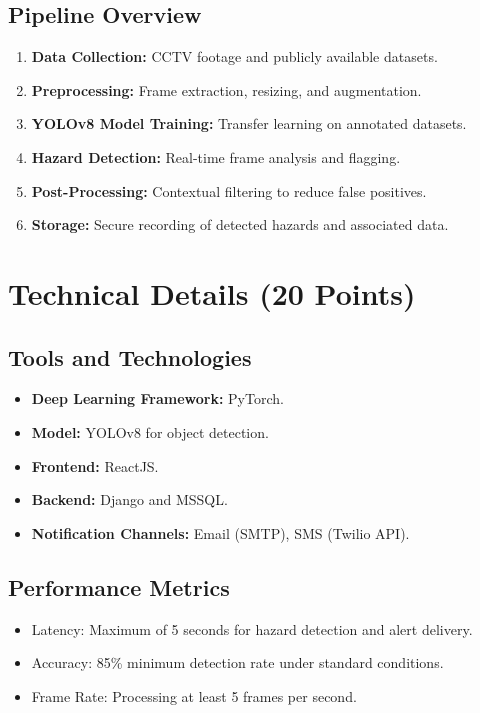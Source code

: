 \documentclass[12pt]{article}
\begin{document}
\subsection{Pipeline Overview}
\begin{enumerate}
    \item \textbf{Data Collection:} CCTV footage and publicly available datasets.
    \item \textbf{Preprocessing:} Frame extraction, resizing, and augmentation.
    \item \textbf{YOLOv8 Model Training:} Transfer learning on annotated datasets.
    \item \textbf{Hazard Detection:} Real-time frame analysis and flagging.
    \item \textbf{Post-Processing:} Contextual filtering to reduce false positives.
    \item \textbf{Storage:} Secure recording of detected hazards and associated data.
\end{enumerate}


\section{Technical Details (20 Points)}
\subsection{Tools and Technologies}
\begin{itemize}
    \item \textbf{Deep Learning Framework:} PyTorch.
    \item \textbf{Model:} YOLOv8 for object detection.
    \item \textbf{Frontend:} ReactJS.
    \item \textbf{Backend:} Django and MSSQL.
    \item \textbf{Notification Channels:} Email (SMTP), SMS (Twilio API).
\end{itemize}

\subsection{Performance Metrics}
\begin{itemize}
    \item Latency: Maximum of 5 seconds for hazard detection and alert delivery.
    \item Accuracy: 85\% minimum detection rate under standard conditions.
    \item Frame Rate: Processing at least 5 frames per second.
\end{itemize}
\end{document}
